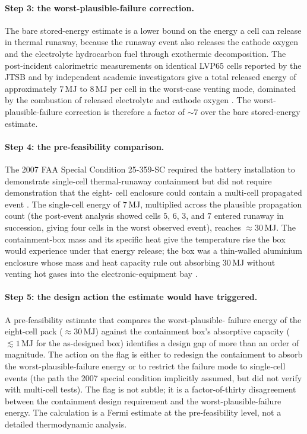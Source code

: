 \paragraph{Step 3: the worst-plausible-failure correction.}
The bare stored-energy estimate is a lower bound on the
energy a cell can release in thermal runaway, because the
runaway event also releases the cathode oxygen and the
electrolyte hydrocarbon fuel through exothermic decomposition.
The post-incident calorimetric measurements on identical
LVP65 cells reported by the JTSB and by independent academic
investigators give a total released energy of approximately
$7 \,\si{\mega\joule}$ to $8 \,\si{\mega\joule}$ per cell in
the worst-case venting mode, dominated by the combustion of
released electrolyte and cathode oxygen
\cite{acc:ntsb-aar14-01-787-battery,paper:ch09t3-williard-pecht-2013}.
The worst-plausible-failure correction is therefore a factor of
$\sim 7$ over the bare stored-energy estimate.

\paragraph{Step 4: the pre-feasibility comparison.}
The 2007 FAA Special Condition 25-359-SC required the
battery installation to demonstrate single-cell thermal-runaway
containment but did not require demonstration that the eight-
cell enclosure could contain a multi-cell propagated event
\cite{acc:ntsb-aar14-01-787-battery}. The single-cell
energy of $7 \,\si{\mega\joule}$, multiplied across the
plausible propagation count (the post-event analysis showed
cells $5$, $6$, $3$, and $7$ entered runaway in succession,
giving four cells in the worst observed event), reaches
$\approx 30 \,\si{\mega\joule}$. The containment-box mass and
its specific heat give the temperature rise the box would
experience under that energy release; the box was a thin-walled
aluminium enclosure whose mass and heat capacity rule out
absorbing $30 \,\si{\mega\joule}$ without venting hot gases
into the electronic-equipment bay
\cite{acc:ntsb-aar14-01-787-battery}.

\paragraph{Step 5: the design action the estimate would have
triggered.}
A pre-feasibility estimate that compares the worst-plausible-
failure energy of the eight-cell pack ($\approx 30
\,\si{\mega\joule}$) against the containment box's absorptive
capacity ($\lesssim 1 \,\si{\mega\joule}$ for the as-designed
box) identifies a design gap of more than an order of
magnitude. The action on the flag is either to redesign the
containment to absorb the worst-plausible-failure energy or to
restrict the failure mode to single-cell events (the path the
2007 special condition implicitly assumed, but did not verify
with multi-cell tests). The flag is not subtle; it is a
factor-of-thirty disagreement between the containment design
requirement and the worst-plausible-failure energy. The
calculation is a Fermi estimate at the pre-feasibility level,
not a detailed thermodynamic analysis.

